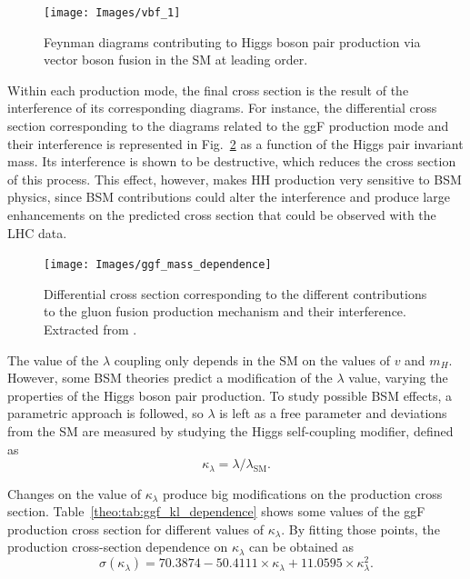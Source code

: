 \documentclass[../main.tex]{subfiles}
\begin{document}
\begin{figure}[h!]
\begin{center}
\texttt{[image: Images/vbf\_1]}
\end{center}
\caption{Feynman diagrams contributing to Higgs boson pair production via vector boson fusion in the SM at leading order.}
\label{theo:fig:vbf_feynman}
\end{figure}

Within each production mode, the final cross section is the result of the interference of its corresponding diagrams. For instance, the differential cross section corresponding to the diagrams related to the ggF production mode and their interference is represented in Fig.~\ref{theo:fig:ggf_mass_dependence} as a function of the Higgs pair invariant mass. Its interference is shown to be destructive, which reduces the cross section of this process. This effect, however, makes HH production very sensitive to BSM physics, since BSM contributions could alter the interference and produce large enhancements on the predicted cross section that could be observed with the LHC data.


\begin{figure}[h!]
\begin{center}
\texttt{[image: Images/ggf\_mass\_dependence]}
\end{center}
\caption{Differential cross section corresponding to the different contributions to the gluon fusion production mechanism and their interference. Extracted from \cite{intro:theo:higgs_potential}.}
\label{theo:fig:ggf_mass_dependence}
\end{figure}

The value of the $\lambda$ coupling only depends in the SM on the values of $v$ and $m_H$. However, some BSM theories predict a modification of the $\lambda$ value, varying the properties of the Higgs boson pair production. To study possible BSM effects, a parametric approach is followed, so $\lambda$ is left as a free parameter and deviations from the SM are measured by studying the Higgs self-coupling modifier, defined as
\begin{equation}
\kappa_\lambda = \lambda / \lambda_{\text{SM}}.
\end{equation}

Changes on the value of $\kappa_\lambda$ produce big modifications on the production cross section. Table~\ref{theo:tab:ggf_kl_dependence} shows some values of the ggF production cross section for different values of $\kappa_\lambda$. By fitting those points, the production cross-section dependence on $\kappa_\lambda$ can be obtained as
\begin{equation}
\sigma(\kappa_\lambda) = 70.3874 - 50.4111 \times \kappa_\lambda + 11.0595 \times \kappa_\lambda^2.
\end{equation}
\end{document}
